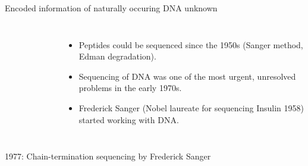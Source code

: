 \documentclass[10pt]{beamer}
\begin{document}
\begin{frame}{Encoded information of naturally occuring DNA unknown}
\begin{columns}[T,onlytextwidth]
\begin{figure}
		\end{figure}
		\vspace{3em}
		\begin{itemize}
			\item Peptides could be sequenced since the 
			1950s (Sanger method, Edman degradation).
			\item Sequencing of DNA was one of the most urgent, unresolved problems in the early 1970s.
			\item Frederick Sanger (Nobel laureate for sequencing Insulin 1958) started working with DNA. 
		\end{itemize}
	\end{columns}
\end{frame}

\begin{frame}{1977: Chain-termination sequencing by Frederick Sanger}
	\begin{columns}[T,onlytextwidth]
		\begin{figure}

\end{figure}
\end{columns}
\end{frame}
\end{document}
